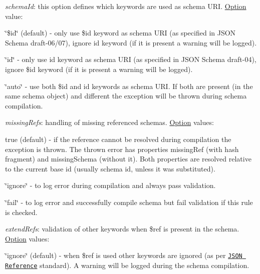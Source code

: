 \begin{DoxyItemize}
\item {\itshape schema\+Id}\+: this option defines which keywords are used as schema U\+RI. \mbox{\hyperlink{structOption}{Option}} value\+:
\begin{DoxyItemize}
\item {\ttfamily \char`\"{}\$id\char`\"{}} (default) -\/ only use {\ttfamily \$id} keyword as schema U\+RI (as specified in J\+S\+ON Schema draft-\/06/07), ignore {\ttfamily id} keyword (if it is present a warning will be logged).
\item {\ttfamily \char`\"{}id\char`\"{}} -\/ only use {\ttfamily id} keyword as schema U\+RI (as specified in J\+S\+ON Schema draft-\/04), ignore {\ttfamily \$id} keyword (if it is present a warning will be logged).
\item {\ttfamily \char`\"{}auto\char`\"{}} -\/ use both {\ttfamily \$id} and {\ttfamily id} keywords as schema U\+RI. If both are present (in the same schema object) and different the exception will be thrown during schema compilation.
\end{DoxyItemize}
\item {\itshape missing\+Refs}\+: handling of missing referenced schemas. \mbox{\hyperlink{structOption}{Option}} values\+:
\begin{DoxyItemize}
\item {\ttfamily true} (default) -\/ if the reference cannot be resolved during compilation the exception is thrown. The thrown error has properties {\ttfamily missing\+Ref} (with hash fragment) and {\ttfamily missing\+Schema} (without it). Both properties are resolved relative to the current base id (usually schema id, unless it was substituted).
\item {\ttfamily \char`\"{}ignore\char`\"{}} -\/ to log error during compilation and always pass validation.
\item {\ttfamily \char`\"{}fail\char`\"{}} -\/ to log error and successfully compile schema but fail validation if this rule is checked.
\end{DoxyItemize}
\item {\itshape extend\+Refs}\+: validation of other keywords when {\ttfamily \$ref} is present in the schema. \mbox{\hyperlink{structOption}{Option}} values\+:
\begin{DoxyItemize}
\item {\ttfamily \char`\"{}ignore\char`\"{}} (default) -\/ when {\ttfamily \$ref} is used other keywords are ignored (as per \href{https://tools.ietf.org/html/draft-pbryan-zyp-json-ref-03#section-3}{\tt J\+S\+ON Reference} standard). A warning will be logged during the schema compilation.

\end{DoxyItemize}
\end{DoxyItemize}
